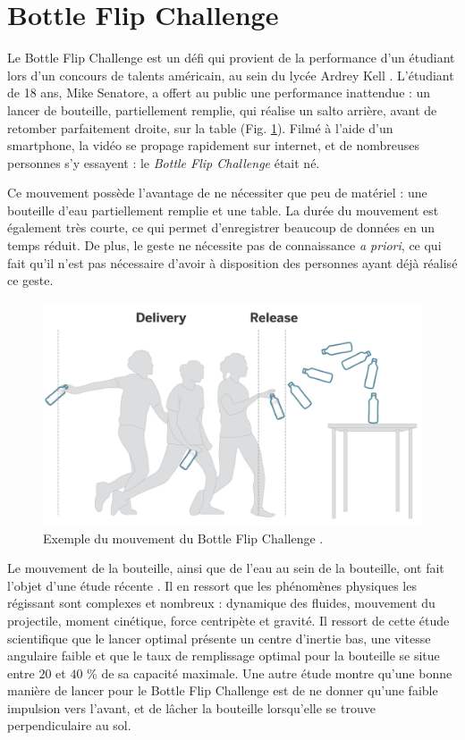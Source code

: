 \section{Bottle Flip Challenge}
Le Bottle Flip Challenge est un défi qui provient de la performance d'un étudiant lors d'un concours de talents américain, au sein du lycée Ardrey Kell \parencite{BottleFlipChallengeOrigin}. L'étudiant de 18 ans, Mike Senatore, a offert au public une performance inattendue : un lancer de bouteille, partiellement remplie, qui réalise un salto arrière, avant de retomber parfaitement droite, sur la table (Fig. \ref{fig:BFC_example}). Filmé à l'aide d'un smartphone, la vidéo se propage rapidement sur internet, et de nombreuses personnes s'y essayent : le \textit{Bottle Flip Challenge} était né.

Ce mouvement possède l'avantage de ne nécessiter que peu de matériel : une bouteille d'eau partiellement remplie et une table. La durée du mouvement est également très courte, ce qui permet d'enregistrer beaucoup de données en un temps réduit. De plus, le geste ne nécessite pas de connaissance \textit{a priori}, ce qui fait qu'il n'est pas nécessaire d'avoir à disposition des personnes ayant déjà réalisé ce geste.

\begin{figure}
	\centering
    \includegraphics[width=\textwidth]{pictures/BFC_example.png}
    \caption[Exemple du mouvement du Bottle Flip Challenge]{Exemple du mouvement du Bottle Flip Challenge \protect\footnotemark.}
    \label{fig:BFC_example}
\end{figure}


Le mouvement de la bouteille, ainsi que de l'eau au sein de la bouteille, ont fait l'objet d'une étude récente \parencite{Dekker2018BF}. Il en ressort que les phénomènes physiques les régissant sont complexes et nombreux : dynamique des fluides, mouvement du projectile, moment cinétique, force centripète et gravité. Il ressort de cette étude scientifique que le lancer optimal présente un centre d'inertie bas, une vitesse angulaire faible et que le taux de remplissage optimal pour la bouteille se situe entre $20$ et $40$ \% de sa capacité maximale. Une autre étude \parencite{BFCAnalysis} montre qu'une bonne manière de lancer pour le Bottle Flip Challenge est de ne donner qu'une faible impulsion vers l'avant, et de lâcher la bouteille lorsqu'elle se trouve perpendiculaire au sol.

